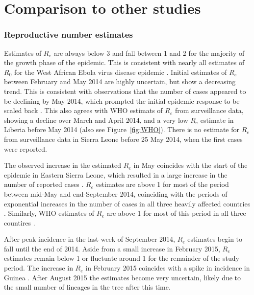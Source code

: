 \section{Comparison to other studies}

\subsubsection*{Reproductive number estimates}

	Estimates of $R_e$ are always below 3 and fall between 1 and 2 for the majority of the growth phase of the epidemic. This is consistent with nearly all estimates of $R_0$ for the West African Ebola virus disease epidemic \citep{Chretien2015}. 
	Initial estimates of $R_e$ between February and May 2014 are highly uncertain, but show a decreasing trend. 
	This is consistent with observations that the number of cases appeared to be declining by May 2014, which prompted the initial epidemic response to be scaled back \citep{Coltart2017}. This also agrees with WHO estimats of $R_e$ from surveillance data, showing a decline over March and April 2014, and a very low $R_e$ estimate in Liberia before May 2014 \citep{WHO2015NEJM} (also see Figure~\ref{fig:WHO}). There is no estimate for $R_e$ from surveillance data in Sierra Leone before 25 May 2014, when the first cases were reported. 

	The observed increase in the estimated $R_e$ in May coincides with the start of the epidemic in Eastern Sierra Leone, which resulted in a large increase in the number of reported cases \citep{WHO2015NEJM, Coltart2017}. $R_e$ estimates are above 1 for most of the period between mid-May and end-September 2014, coinciding with the periods of exponential increases in the number of cases in all three heavily affected countries \citep{WHO2016NEJM}. Similarly, WHO estimates of $R_e$ are above 1 for most of this period in all three countires \citep{WHO2015NEJM}. 

	After peak incidence in the last week of September 2014, $R_e$ estimates begin to fall until the end of 2014. Aside from a small increase in February 2015, $R_e$ estimates remain below 1 or fluctuate around 1 for the remainder of the study period. The increase in $R_e$ in February 2015 coincides with a spike in incidence in Guinea \citep{WHO2015NEJM}. After August 2015 the estimates become very uncertain, likely due to the small number of lineages in the tree after this time. 

